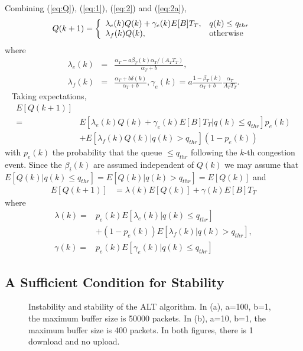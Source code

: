 \documentclass[10pt,twocolumn, journal]{IEEEtran}
\def\DLaddition#1{\noindent\ {\color{black} #1}}
\begin{document}
Combining (\ref{eq:Q}), (\ref{eq:1}), (\ref{eq:2}) and (\ref{eq:2a}),
\[Q(k+1) = \left\{
    \begin{array}{l l}
    \lambda_e(k)Q(k) + \gamma_e(k)E[B]T_T, & q(k)\le q_{thr}\\
    \lambda_f(k)Q(k), &  \mbox{otherwise}
    \\ \end{array}
    \right.
\]
where
\begin{eqnarray*}
\lambda_e(k)&=&\frac{\alpha_T-a\beta_T(k)\alpha_T/(A_TT_T)}{\alpha_T+b} ,\\
\lambda_f(k)&=&\frac{\alpha_T+ b\delta(k)}{\alpha_T+b},\gamma_e(k)=a\frac{1-\beta_T(k)}{\alpha_T+b}\frac{\alpha_T}{A_TT_T}.
\end{eqnarray*}
\DLaddition{
Taking expectations,
\begin{align*}
E[Q(k+1)] & \\
=&E[\lambda_e(k)Q(k) + \gamma_e(k)E[B]T_T|q(k)\le q_{thr}]p_e(k)\\
& + E[\lambda_f(k)Q(k)|q(k)> q_{thr}](1-p_e(k))
\end{align*}
with $p_{e}(k)$ the probability that the queue $\le q_{thr}$ following the $k$-th congestion event.
Since the $\beta_i(k)$ are assumed independent of $Q(k)$ we may assume that $E[Q(k)|q(k)\le q_{thr}]=E[Q(k)|q(k)> q_{thr}]=E[Q(k)]$ and
\begin{align}\label{eq:average}
E[Q(k+1)]&=\lambda(k)E[Q(k)] + \gamma(k) E[B]T_T
\end{align}
where
\begin{align*}
\lambda(k)=&p_{e}(k)E[\lambda_e(k)|q(k)\le q_{thr}] \\
&+(1-p_{e}(k))E[\lambda_f(k)|q(k)> q_{thr}],\\
\gamma(k)=&p_e(k)E[\gamma_e(k)|q(k)\le q_{thr}]
\end{align*}
}


\subsection{A Sufficient Condition for Stability}\label{subsec_stability}

\begin{figure}[tb]
   \centering
   \caption{Instability and stability of the ALT algorithm.
   In (a), a=100, b=1, the maximum buffer size is 50000 packets.
   In (b), a=10, b=1, the maximum buffer size is 400 packets.
   In both figures, there is 1 download and no upload.}
   \label{fig_stability}
\end{figure}
\end{document}
